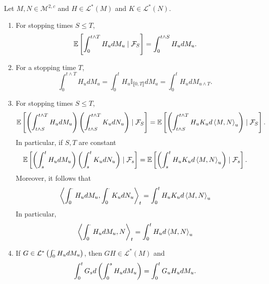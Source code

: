 \begin{thm}
    Let $M,N \in \mathcal{M}^{2,c}$ and $H\in \mathcal{L}^*(M)$ and $K\in \mathcal{L}^*(N)$.
    \begin{enumerate}[label=(\arabic{*})]
        \item For stopping times $S \leq T$,
        \begin{equation*}
            \mathbb{E}\left[\int_0^{t \wedge T} H_u dM_u \mid \mathcal{F}_S\right] = \int_0^{t \wedge S} H_u dM_u.
        \end{equation*}

        \item For a stopping time $T$,
        \begin{equation*}
            \int_0^{t \wedge T} H_u dM_u = \int_0^{t} H_u \mathbb{I}_{\llbracket 0,T \rrbracket} dM_u = \int_0^{t} H_u dM_{u \wedge T}.
        \end{equation*}

        \item For stopping times $S \leq T$,
        \begin{equation*}
            \mathbb{E}\left[\left(\int_{t \wedge S}^{t \wedge T} H_u dM_u\right)\left(\int_{t \wedge S}^{t \wedge T} K_u dN_u\right) \mid \mathcal{F}_S\right] = \mathbb{E}\left[\left(\int_{t \wedge S}^{t \wedge T} H_uK_u d\left\langle M,N \right\rangle_u\right) \mid \mathcal{F}_S\right].
        \end{equation*}
        In particular, if $S,T$ are constant
        \begin{equation*}
            \mathbb{E}\left[\left(\int_s^t H_u dM_u\right)\left(\int_s^t K_u dN_u\right) \mid \mathcal{F}_s\right] = \mathbb{E}\left[\left(\int_s^t H_uK_u d\left\langle M,N \right\rangle_u\right) \mid \mathcal{F}_s\right].
        \end{equation*}
        Moreover, it follows that
        \begin{equation*}
            \left\langle \int_0^\cdot H_udM_u,\int_0^\cdot K_u dN_u \right\rangle_t = \int_0^t H_uK_u d\left\langle M,N \right\rangle_u
        \end{equation*}
        In particular,
        \begin{equation*}
            \left\langle \int_0^\cdot H_udM_u,N \right\rangle_t = \int_0^t H_u d\left\langle M,N \right\rangle_u
        \end{equation*}

        \item If $G \in \mathcal{L}^*\left( \int_0^\cdot H_u dM_u \right)$, then $GH \in \mathcal{L}^*(M)$ and
        \begin{equation*}
            \int_0^t G_s d\left(\int_0^s H_u dM_u\right) = \int_0^tG_uH_u dM_u.
        \end{equation*}
    \end{enumerate}
\end{thm}

